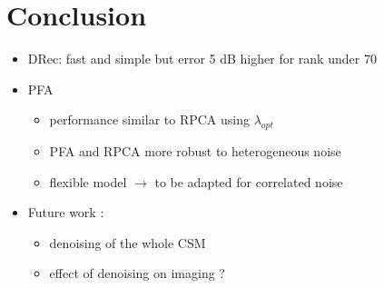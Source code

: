 \documentclass[10pt,xcolor=x11names,compress, notes=show]{beamer}%
\begin{document}
\section*{Conclusion}
\begin{frame}{\insertsectionhead}
	\begin{itemize}
		\item DRec: fast and simple but error 5 dB higher for rank under 70\\
		\vfill
		\item PFA 
		\begin{itemize}
		        \item performance similar to RPCA using $\lambda_{opt}$
			\item PFA and RPCA more robust to heterogeneous noise	
			\item flexible model $\rightarrow$ to be adapted for correlated noise	
		\end{itemize}
		\vfill
		\item Future work : 
		\begin{itemize}
		        \item denoising of the whole CSM
		        \item effect of denoising on imaging ?
		\end{itemize}
	\end{itemize}
\end{frame}
\end{document}
